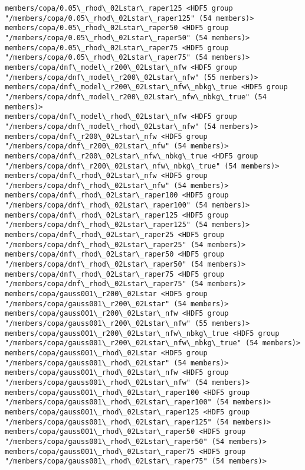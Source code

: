 \documentclass[11pt]{article}
\begin{document}
\begin{Verbatim}[commandchars=\\\{\}]
members/copa/0.05\_rhod\_02Lstar\_raper125 <HDF5 group "/members/copa/0.05\_rhod\_02Lstar\_raper125" (54 members)>
members/copa/0.05\_rhod\_02Lstar\_raper50 <HDF5 group "/members/copa/0.05\_rhod\_02Lstar\_raper50" (54 members)>
members/copa/0.05\_rhod\_02Lstar\_raper75 <HDF5 group "/members/copa/0.05\_rhod\_02Lstar\_raper75" (54 members)>
members/copa/dnf\_model\_r200\_02Lstar\_nfw <HDF5 group "/members/copa/dnf\_model\_r200\_02Lstar\_nfw" (55 members)>
members/copa/dnf\_model\_r200\_02Lstar\_nfw\_nbkg\_true <HDF5 group "/members/copa/dnf\_model\_r200\_02Lstar\_nfw\_nbkg\_true" (54 members)>
members/copa/dnf\_model\_rhod\_02Lstar\_nfw <HDF5 group "/members/copa/dnf\_model\_rhod\_02Lstar\_nfw" (54 members)>
members/copa/dnf\_r200\_02Lstar\_nfw <HDF5 group "/members/copa/dnf\_r200\_02Lstar\_nfw" (54 members)>
members/copa/dnf\_r200\_02Lstar\_nfw\_nbkg\_true <HDF5 group "/members/copa/dnf\_r200\_02Lstar\_nfw\_nbkg\_true" (54 members)>
members/copa/dnf\_rhod\_02Lstar\_nfw <HDF5 group "/members/copa/dnf\_rhod\_02Lstar\_nfw" (54 members)>
members/copa/dnf\_rhod\_02Lstar\_raper100 <HDF5 group "/members/copa/dnf\_rhod\_02Lstar\_raper100" (54 members)>
members/copa/dnf\_rhod\_02Lstar\_raper125 <HDF5 group "/members/copa/dnf\_rhod\_02Lstar\_raper125" (54 members)>
members/copa/dnf\_rhod\_02Lstar\_raper25 <HDF5 group "/members/copa/dnf\_rhod\_02Lstar\_raper25" (54 members)>
members/copa/dnf\_rhod\_02Lstar\_raper50 <HDF5 group "/members/copa/dnf\_rhod\_02Lstar\_raper50" (54 members)>
members/copa/dnf\_rhod\_02Lstar\_raper75 <HDF5 group "/members/copa/dnf\_rhod\_02Lstar\_raper75" (54 members)>
members/copa/gauss001\_r200\_02Lstar <HDF5 group "/members/copa/gauss001\_r200\_02Lstar" (54 members)>
members/copa/gauss001\_r200\_02Lstar\_nfw <HDF5 group "/members/copa/gauss001\_r200\_02Lstar\_nfw" (55 members)>
members/copa/gauss001\_r200\_02Lstar\_nfw\_nbkg\_true <HDF5 group "/members/copa/gauss001\_r200\_02Lstar\_nfw\_nbkg\_true" (54 members)>
members/copa/gauss001\_rhod\_02Lstar <HDF5 group "/members/copa/gauss001\_rhod\_02Lstar" (54 members)>
members/copa/gauss001\_rhod\_02Lstar\_nfw <HDF5 group "/members/copa/gauss001\_rhod\_02Lstar\_nfw" (54 members)>
members/copa/gauss001\_rhod\_02Lstar\_raper100 <HDF5 group "/members/copa/gauss001\_rhod\_02Lstar\_raper100" (54 members)>
members/copa/gauss001\_rhod\_02Lstar\_raper125 <HDF5 group "/members/copa/gauss001\_rhod\_02Lstar\_raper125" (54 members)>
members/copa/gauss001\_rhod\_02Lstar\_raper50 <HDF5 group "/members/copa/gauss001\_rhod\_02Lstar\_raper50" (54 members)>
members/copa/gauss001\_rhod\_02Lstar\_raper75 <HDF5 group "/members/copa/gauss001\_rhod\_02Lstar\_raper75" (54 members)>

\end{Verbatim}
\end{document}
